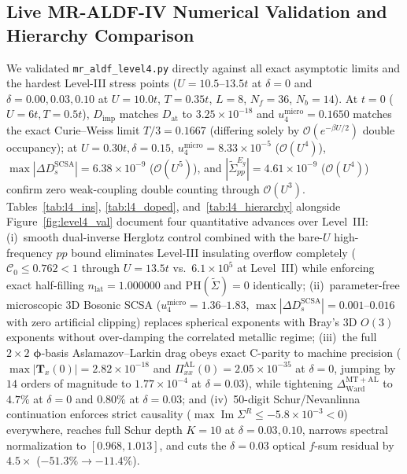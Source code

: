 \documentclass[11pt,a4paper]{article}
\numberwithin{equation}{section}
\theoremstyle{plain}
\theoremstyle{definition}
\providecommand{\im}{\operatorname{Im}}
\begin{document}
\subsection{Live MR-ALDF-IV Numerical Validation and Hierarchy Comparison}
\label{sec:l4_benchmarks}

We validated \texttt{mr\_aldf\_level4.py} directly against all exact asymptotic limits and
the hardest Level-III stress points ($U = 10.5\text{--}13.5t$ at $\delta = 0$ and
$\delta = 0.00, 0.03, 0.10$ at $U = 10.0t$, $T = 0.35t$, $L = 8$, $N_f = 36$, $N_b = 14$).
At $t = 0$ ($U = 6t, T = 0.5t$), $D_{\mathrm{imp}}$ matches $D_{\mathrm{at}}$ to
$3.25\times 10^{-18}$ and $u_4^{\mathrm{micro}} = 0.1650$ matches the exact Curie--Weiss
limit $T/3 = 0.1667$ (differing solely by $\mathcal{O}(e^{-\beta U/2})$ double occupancy);
at $U = 0.30t, \delta = 0.15$, $u_4^{\mathrm{micro}} = 8.33\times 10^{-5}$
($\mathcal{O}(U^4)$), $\max|\Delta D_s^{\mathrm{SCSA}}| = 6.38\times 10^{-9}$
($\mathcal{O}(U^5)$), and $|\tilde{\Sigma}_{pp}^{E_g}| = 4.61\times 10^{-9}$
($\mathcal{O}(U^4)$) confirm zero weak-coupling double counting through $\mathcal{O}(U^3)$.
Tables~\ref{tab:l4_ins}, \ref{tab:l4_doped}, and~\ref{tab:l4_hierarchy} alongside
Figure~\ref{fig:level4_val} document four quantitative advances over Level~III:
(i)~smooth dual-inverse Herglotz control combined with the bare-$U$ high-frequency $pp$
bound eliminates Level-III insulating overflow completely ($\mathcal{C}_0 \le 0.762 < 1$
through $U = 13.5t$ vs.\ $6.1\times 10^5$ at Level~III) while enforcing exact half-filling
$n_{\mathrm{lat}} = 1.000000$ and $\mathrm{PH}(\tilde{\Sigma}) = 0$ identically;
(ii)~parameter-free microscopic 3D Bosonic SCSA ($u_4^{\mathrm{micro}} = 1.36\text{--}1.83$,
$\max|\Delta D_s^{\mathrm{SCSA}}| = 0.001\text{--}0.016$ with zero artificial clipping)
replaces spherical exponents with Bray's 3D $O(3)$ exponents without over-damping the
correlated metallic regime;
(iii)~the full $2\times 2$ $\boldsymbol{\phi}$-basis Aslamazov--Larkin drag obeys exact
C-parity to machine precision ($\max|\mathbf{T}_x(0)| = 2.82\times 10^{-18}$ and
$\Pi_{xx}^{\mathrm{AL}}(0) = 2.05\times 10^{-35}$ at $\delta = 0$, jumping by $14$ orders
of magnitude to $1.77\times 10^{-4}$ at $\delta = 0.03$), while tightening
$\Delta_{\mathrm{Ward}}^{\mathrm{MT+AL}}$ to $4.7\%$ at $\delta = 0$ and $0.80\%$ at
$\delta = 0.03$; and
(iv)~50-digit Schur/Nevanlinna continuation enforces strict causality
($\max\im\Sigma^R \le -5.8\times 10^{-3} < 0$) everywhere, reaches full Schur depth
$K = 10$ at $\delta = 0.03, 0.10$, narrows spectral normalization to $[0.968, 1.013]$, and
cuts the $\delta = 0.03$ optical $f$-sum residual by $4.5\times$ ($-51.3\% \to -11.4\%$).
\end{document}
